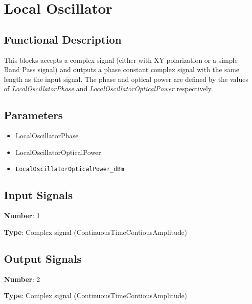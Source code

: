 \section{Local Oscillator}

\subsection*{Functional Description}

This blocks accepts a complex signal (either with XY polarization or a simple Band Pass signal) and outputs a phase constant complex signal with the same length as the input signal. The phase and optical power are defined by the values of \textit{LocalOscillatorPhase} and \textit{LocalOscillatorOpticalPower} respectively.

\subsection*{Parameters}

\begin{multicols}{2}
	\begin{itemize}
		\item LocalOscillatorPhase
		\item LocalOscillatorOpticalPower
		\item \verb|LocalOscillatorOpticalPower_dBm|
	\end{itemize}
\end{multicols}

\subsection*{Input Signals}

\textbf{Number}: 1

\textbf{Type}: Complex signal (ContinuousTimeContiousAmplitude)

\subsection*{Output Signals}

\textbf{Number}: 2

\textbf{Type}: Complex signal (ContinuousTimeContiousAmplitude)

\pagebreak